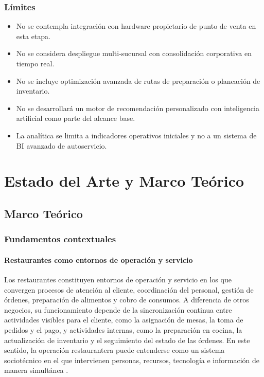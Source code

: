 \documentclass[12pt]{report}
\begin{document}
\subsection{Límites}
\begin{itemize}[leftmargin=*, itemsep=0.35em]
  \item No se contempla integración con hardware propietario de punto de venta en esta etapa.
  \item No se considera despliegue multi-sucursal con consolidación corporativa en tiempo real.
  \item No se incluye optimización avanzada de rutas de preparación o planeación de inventario.
  \item No se desarrollará un motor de recomendación personalizado con inteligencia artificial como parte del alcance base.
  \item La analítica se limita a indicadores operativos iniciales y no a un sistema de BI avanzado de autoservicio.
\end{itemize}

\chapter{Estado del Arte y Marco Teórico}
\section{Marco Teórico}
\subsection{Fundamentos contextuales}
\subsubsection{Restaurantes como entornos de operación y servicio}

Los restaurantes constituyen entornos de operación y servicio en los que convergen procesos de atención al cliente, coordinación del personal, gestión de órdenes, preparación de alimentos y cobro de consumos. A diferencia de otros negocios, su funcionamiento depende de la sincronización continua entre actividades visibles para el cliente, como la asignación de mesas, la toma de pedidos y el pago, y actividades internas, como la preparación en cocina, la actualización de inventario y el seguimiento del estado de las órdenes. En este sentido, la operación restaurantera puede entenderse como un sistema sociotécnico en el que intervienen personas, recursos, tecnología e información de manera simultánea \cite{lightspeed_boh_foh_2024,square_restaurant_pos_2025}.
\end{document}

